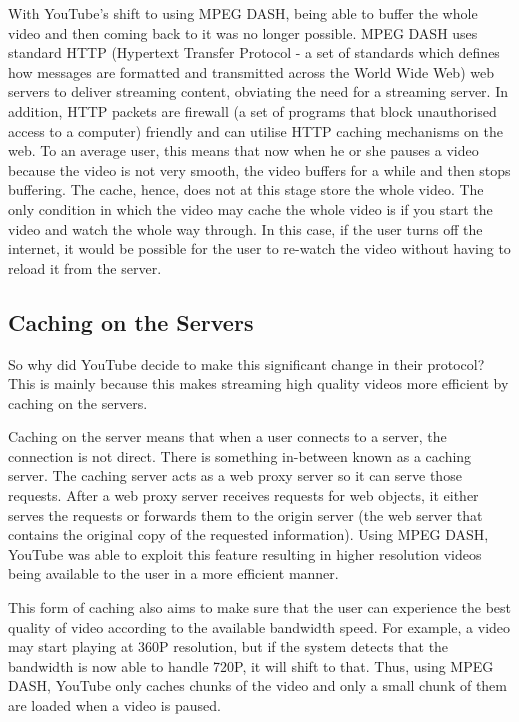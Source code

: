 With YouTube's shift to using MPEG DASH, being able to buffer the whole video and then coming back to it was no longer possible. MPEG DASH uses standard HTTP (Hypertext Transfer Protocol - a set of standards which defines how messages are formatted and transmitted across the World Wide Web) web servers to deliver streaming content, obviating the need for a streaming server. In addition, HTTP packets are firewall (a set of programs that block unauthorised access to a computer) friendly and can utilise HTTP caching mechanisms on the web. To an average user, this means that now when he or she pauses a video because the video is not very smooth, the video buffers for a while and then stops buffering. The cache, hence, does not at this stage store the whole video. The only condition in which the video may cache the whole video is if you start the video and watch the whole way through. In this case, if the user turns off the internet, it would be possible for the user to re-watch the video without having to reload it from the server.

\subsection{Caching on the Servers}
So why did YouTube decide to make this significant change in their protocol? This is mainly because this makes streaming high quality videos more efficient by caching on the servers.

Caching on the server means that when a user connects to a server, the connection is not direct. There is something in-between known as a caching server. The caching server acts as a web proxy server so it can serve those requests. After a web proxy server receives requests for web objects, it either serves the requests or forwards them to the origin server (the web server that contains the original copy of the requested information). Using MPEG DASH, YouTube was able to exploit this feature resulting in higher resolution videos being available to the user in a more efficient manner.

This form of caching also aims to make sure that the user can experience the best quality of video according to the available bandwidth speed. For example, a video may start playing at 360P resolution, but if the system detects that the bandwidth is now able to handle 720P, it will shift to that. Thus, using MPEG DASH, YouTube only caches chunks of the video and only a small chunk of them are loaded when a video is paused.

